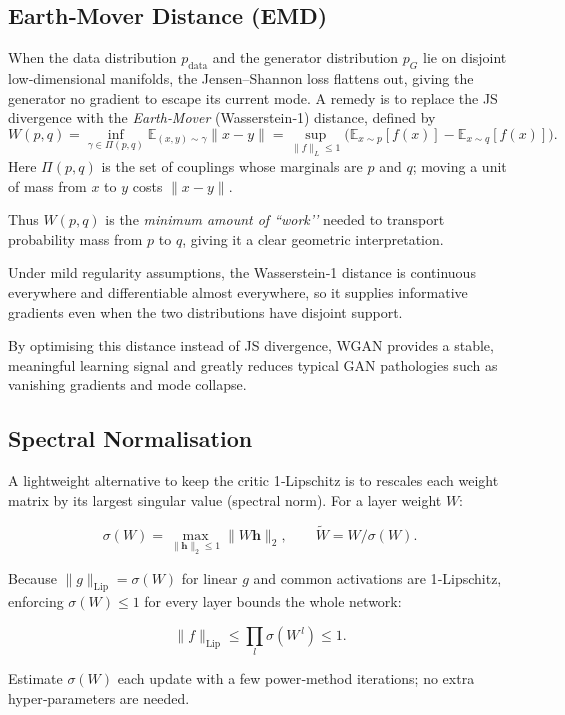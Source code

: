 \documentclass{article}
\begin{document}
\subsection*{Earth‑Mover Distance (EMD)}

When the data distribution \(p_{\mathrm{data}}\) and the generator distribution \(p_G\) lie on disjoint low‑dimensional manifolds, the Jensen–Shannon loss flattens out, giving the generator no gradient to escape its current mode.  
A remedy is to replace the JS divergence with the \emph{Earth‑Mover} (Wasserstein‑1) distance, defined by
\[
  W(p,q)=\inf_{\gamma\in\Pi(p,q)}
           \mathbb{E}_{(x,y)\sim\gamma}\|x-y\|
        =\sup_{\|f\|_{L}\le1}
           \bigl(\mathbb{E}_{x\sim p}[f(x)]
                -\mathbb{E}_{x\sim q}[f(x)]\bigr).
\]
Here \(\Pi(p,q)\) is the set of couplings whose marginals are \(p\) and \(q\); moving a unit of mass from \(x\) to \(y\) costs \(\|x-y\|\).  

Thus \(W(p,q)\) is the \emph{minimum amount of “work’’} needed to transport probability mass from \(p\) to \(q\), giving it a clear geometric interpretation.

Under mild regularity assumptions, the Wasserstein‑1 distance is continuous everywhere and differentiable almost everywhere, so it supplies informative gradients even when the two distributions have disjoint support.

By optimising this distance instead of JS divergence, WGAN provides a stable, meaningful learning signal and greatly reduces typical GAN pathologies such as vanishing gradients and mode collapse.

\subsection{Spectral Normalisation}
A lightweight alternative to keep the critic 1‑Lipschitz is to rescales each weight matrix by its largest singular value (spectral norm). For a layer weight \(W\):

\[
\sigma(W)=\max_{\|\mathbf{h}\|_2\le1}\|W\mathbf{h}\|_2,\qquad 
\widetilde{W}=W/\sigma(W).
\]

Because \(\|g\|_{\mathrm{Lip}}=\sigma(W)\) for linear \(g\) and common activations are 1‑Lipschitz, enforcing \(\sigma(W)\le1\) for every layer bounds the whole network:

\[
\|f\|_{\mathrm{Lip}}\le\prod_{l}\sigma(W^{\,l})\le1.
\]

Estimate \(\sigma(W)\) each update with a few power‑method iterations; no extra hyper‑parameters are needed.
\end{document}

